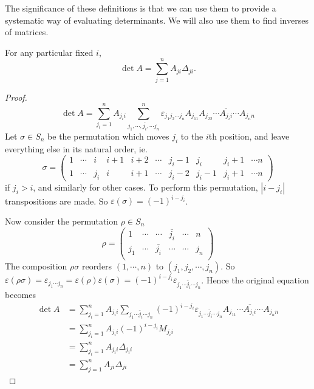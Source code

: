 \documentclass[a4paper]{article}
\begin{document}
The significance of these definitions is that we can use them to provide a systematic way of evaluating determinants. We will also use them to find inverses of matrices.
\begin{thm}
  For any particular fixed $i$,
  \[
    \det A = \sum_{j = 1}^{n} A_{ji}\Delta_{ji}.
  \]
\end{thm}
\begin{proof}
  \[
    \det A = \sum_{j_i = 1}^nA_{j_ii} \sum_{j_1, \cdots, \overline{j_i}, \cdots j_n}^n \varepsilon_{j_1j_2\cdots j_n} A_{j_11}A_{j_22}\cdots \overline{A_{j_ii}}\cdots A_{j_nn}
  \]
  Let $\sigma \in S_n$ be the permutation which moves $j_i$ to the $i$th position, and leave everything else in its natural order, ie.
  \[
    \sigma =
    \begin{pmatrix}
      1 &\cdots& i & i + 1 & i + 2 & \cdots &j_i - 1&j_i& j_i + 1 & \cdots n\\
      1 & \cdots & j_i & i & i + 1 & \cdots & j_i - 2 & j_i - 1 & j_i + 1 & \cdots n
    \end{pmatrix}
  \]
  if $j_i > i$, and similarly for other cases. To perform this permutation, $|i - j_i|$ transpositions are made. So $\varepsilon(\sigma) = (-1)^{i - j_i}$.

  Now consider the permutation $\rho\in S_n$
  \[
    \rho =
    \begin{pmatrix}
      1 & \cdots & \cdots & \bar {j_i} & \cdots & n\\
      j_1 & \cdots & \bar{j_i} & \cdots & \cdots & j_n\\
    \end{pmatrix}
  \]
  The composition $\rho\sigma$ reorders $(1, \cdots, n)$  to $(j_1, j_2,\cdots, j_n)$. So $\varepsilon(\rho\sigma) = \varepsilon_{j_1\cdots j_n} = \varepsilon(\rho)\varepsilon(\sigma) = (-1)^{i - j_i} \varepsilon_{j_1\cdots \bar j_i \cdots j_n}$. Hence the original equation becomes
  \begin{align*}
    \det A &= \sum_{j_i = 1}^n A_{j_i i} \sum_{j_1\cdots \bar j_i\cdots j_n}(-1)^{i - j_i} \varepsilon_{j_1\cdots \bar j_i \cdots j_n} A_{j_11}\cdots \overline{A_{j_ii}} \cdots A_{j_nn}\\
    &= \sum_{j_i = 1}^n A_{j_ii} (-1)^{i - j_i}M_{j_ii}\\
    &= \sum_{j_i = 1}^{n} A_{j_ii}\Delta_{j_ii}\\
    &= \sum_{j = 1}^{n} A_{ji}\Delta_{ji}
  \end{align*}
\end{proof}
\end{document}
